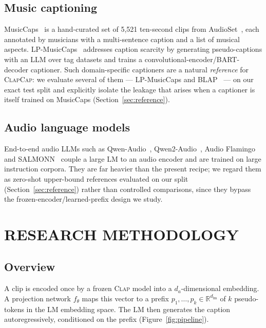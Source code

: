 \documentclass[9pt]{report}
\newcommand{\clapenc}{\textsc{Clap}}
\newcommand{\sys}{\textsc{ClapCap}}
\begin{document}
\section{Music captioning}
MusicCaps~\cite{agostinelli2023musiclm} is a hand-curated set of 5{,}521 ten-second clips from
AudioSet~\cite{gemmeke2017audioset}, each annotated by musicians with a multi-sentence caption
and a list of musical aspects. LP-MusicCaps~\cite{doh2023lpmusiccaps} addresses caption scarcity
by generating pseudo-captions with an LLM over tag datasets and trains a
convolutional-encoder/BART-decoder captioner. Such domain-specific captioners are a natural
\emph{reference} for \sys{}: we evaluate several of them --- LP-MusicCaps and
BLAP~\cite{lanzendorfer2025blap} --- on our exact test split and explicitly isolate the leakage
that arises when a captioner is itself trained on MusicCaps (Section~\ref{sec:reference}).

\section{Audio language models}
End-to-end audio LLMs such as Qwen-Audio~\cite{chu2023qwenaudio},
Qwen2-Audio~\cite{chu2024qwen2audio}, Audio Flamingo~\cite{ghosh2026afnext} and
SALMONN~\cite{tang2024salmonn} couple a large LM to an audio encoder and are trained on large
instruction corpora. They are far heavier than the present recipe; we regard them as
zero-shot upper-bound references evaluated on our split (Section~\ref{sec:reference}) rather
than controlled comparisons, since they bypass the frozen-encoder/learned-prefix design we
study.

\chapter{RESEARCH METHODOLOGY}\label{ch:method}

\section{Overview}
A clip is encoded once by a frozen \clapenc{} model into a $d_a$-dimensional embedding. A
projection network $f_\theta$ maps this vector to a prefix
$p_1,\dots,p_k \in \mathbb{R}^{d_{\text{lm}}}$ of $k$ pseudo-tokens in the LM embedding space.
The LM then generates the caption autoregressively, conditioned on the prefix
(Figure~\ref{fig:pipeline}).
\end{document}
